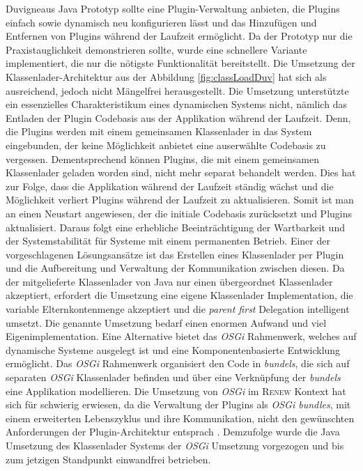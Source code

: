 			Duvigneaus Java Prototyp \cite{Duvigneau09} sollte eine Plugin-Verwaltung anbieten, die Plugins einfach sowie dynamisch neu konfigurieren lässt und das Hinzufügen und Entfernen von Plugins während der Laufzeit ermöglicht. Da der Prototyp nur die Praxistauglichkeit demonstrieren sollte, wurde eine schnellere Variante implementiert, die nur die nötigste Funktionalität bereitstellt. Die Umsetzung der Klassenlader-Architektur aus der Abbildung \ref{fig:classLoadDuv} hat sich als ausreichend, jedoch nicht Mängelfrei herausgestellt. Die Umsetzung unterstützte ein essenzielles Charakteristikum eines dynamischen Systems nicht, nämlich das Entladen der Plugin Codebasis aus der Applikation während der Laufzeit. Denn, die Plugins werden mit einem gemeinsamen Klassenlader in das System eingebunden, der keine Möglichkeit anbietet eine auserwählte Codebasis zu vergessen. Dementsprechend können Plugins, die mit einem gemeinsamen Klassenlader geladen worden sind, nicht mehr separat behandelt werden. Dies hat zur Folge, dass die Applikation während der Laufzeit ständig wächst und die Möglichkeit verliert Plugins während der Laufzeit zu aktualisieren. Somit ist man an einen Neustart angewiesen, der die initiale Codebasis zurücksetzt und Plugins aktualisiert. Daraus folgt eine erhebliche Beeinträchtigung der Wartbarkeit und der Systemstabilität für Systeme mit einem permanenten Betrieb. \bigbreak
			Einer der vorgeschlagenen Lösungsansätze ist das Erstellen eines Klassenlader per Plugin und die Aufbereitung und Verwaltung der Kommunikation zwischen diesen. Da der mitgelieferte Klassenlader von Java nur einen übergeordnet Klassenlader akzeptiert, erfordert die Umsetzung eine eigene Klassenlader Implementation, die variable Elternkontenmenge akzeptiert und die \textit{parent first} Delegation intelligent umsetzt.\newline
			Die genannte Umsetzung bedarf einen enormen Aufwand und viel Eigenimplementation. Eine Alternative bietet das \textit{OSGi} Rahmenwerk, welches auf dynamische Systeme ausgelegt ist und eine Komponentenbasierte Entwicklung ermöglicht. Das \textit{OSGi} Rahmenwerk organisiert den Code in \textit{bundels}, die sich auf separaten \textit{OSGi} Klassenlader befinden und über eine Verknüpfung der \textit{bundels} eine Applikation modellieren. \newline
			Die Umsetzung von \textit{OSGi} im \textsc{Renew} Kontext hat sich für schwierig erwiesen, da die Verwaltung der Plugins als \textit{OSGi bundles}, mit einem erweiterten Lebenszyklus und ihre Kommunikation, nicht den gewünschten Anforderungen der Plugin-Architektur entsprach \cite{Duvigneau09}. Demzufolge wurde die Java Umsetzung des Klassenlader Systems der \textit{OSGi} Umsetzung vorgezogen und bis zum jetzigen Standpunkt einwandfrei betrieben. \bigbreak

